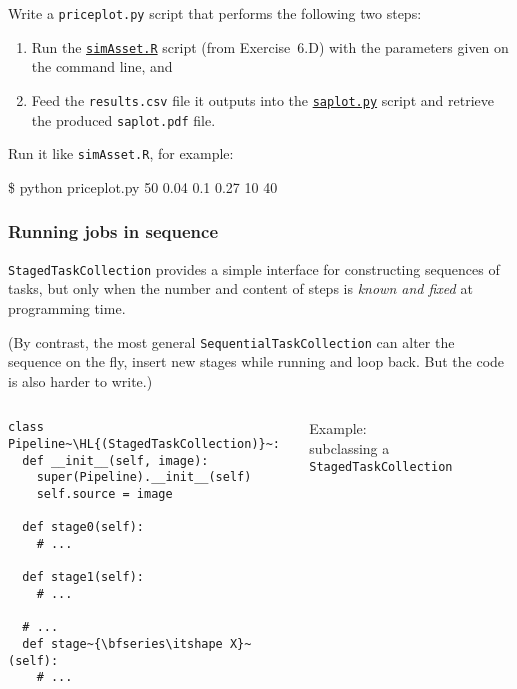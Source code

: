 \documentclass[english,serif,mathserif,xcolor=pdftex,dvipsnames,table]{beamer}
\begin{document}
\begin{frame}
  \begin{exercise*}[8.A]

    Write a \texttt{priceplot.py} script that performs the following two steps:
    \begin{enumerate}
    \item Run the
      \href{https://github.com/uzh/gc3pie/blob/master/docs/programmers/tutorials/workflows/downloads/simAsset.R}{\texttt{simAsset.R}}
      script (from Exercise~6.D) with the parameters given on the command line,
      and
    \item Feed the \texttt{results.csv} file it outputs into the
      \href{https://github.com/uzh/gc3pie/blob/master/docs/programmers/tutorials/workflows/downloads/saplot.py}{\texttt{saplot.py}}
      script and retrieve the produced \texttt{saplot.pdf} file.
    \end{enumerate}

    \+
    Run it like \texttt{simAsset.R}, for example:
\begin{semiverbatim}
  \$ python priceplot.py 50 0.04 0.1 0.27 10 40
\end{semiverbatim}

  \end{exercise*}
\end{frame}


\begin{frame}[fragile]
  \frametitle{Running jobs in sequence}

  \texttt{StagedTaskCollection} provides a simple interface for
  constructing sequences of tasks, but only when the number and
  content of steps is \emph{known and fixed} at programming time.

  \+
  (By contrast, the most general \texttt{SequentialTaskCollection}
  can alter the sequence on the fly, insert new stages while running
  and loop back. But the code is also harder to write.)
\end{frame}


\begin{frame}[fragile]
  \begin{columns}[t]
    \begin{column}{0.6\textwidth}
\begin{lstlisting}[basicstyle=\footnotesize\ttfamily]
class Pipeline~\HL{(StagedTaskCollection)}~:
  def __init__(self, image):
    super(Pipeline).__init__(self)
    self.source = image

  def stage0(self):
    # ...

  def stage1(self):
    # ...

  # ...
  def stage~{\bfseries\itshape X}~(self):
    # ...
      \end{lstlisting}
    \end{column}
    \begin{column}{0.4\textwidth}
      \raggedleft

      \+\+\small
      Example: \\
      subclassing a
      \texttt{StagedTaskCollection}
    \end{column}
  \end{columns}
\end{frame}
\end{document}
